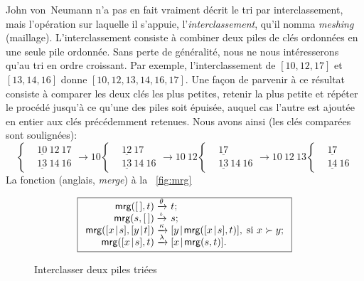 John von~Neumann n'a pas en fait vraiment décrit le tri par
interclassement, mais l'opération sur laquelle il s'appuie,
l'\emph{interclassement}, qu'il nomma \emph{meshing}
(maillage). L'interclassement consiste à combiner deux piles de clés
ordonnées en une seule pile ordonnée. Sans perte de généralité, nous
ne nous intéresserons qu'au tri en ordre croissant. Par exemple,
l'interclassement de \([10,12,17]\) et \([13,14,16]\) donne
\([10,12,13,14,16,17]\). Une façon de parvenir à ce résultat consiste
à comparer les deux clés les plus petites, retenir la plus petite et
répéter le procédé jusqu'à ce qu'une des piles soit épuisée, auquel
cas l'autre est ajoutée en entier aux clés précédemment retenues. Nous
avons ainsi (les clés comparées sont soulignées):
\begin{equation*}
\left\{
\begin{aligned}
&\underline{10}~12~17\\
&\underline{13}~14~16
\end{aligned}
\right.
\rightarrow 10
\left\{
\begin{aligned}
&\underline{12}~17\\
&\underline{13}~14~16
\end{aligned}
\right.
\rightarrow 10~12
\left\{
\begin{aligned}
&\underline{17}\\
&\underline{13}~14~16
\end{aligned}
\right.
\rightarrow 10~12~13
\left\{
\begin{aligned}
&\underline{17}\\
&\underline{14}~16
\end{aligned}
\right.
\end{equation*}
La fonction  (anglais, \emph{merge})
à la \fig~\vref{fig:mrg}
\begin{figure}[b]
\begin{equation*}
\boxed{%
\begin{array}{r@{\;}l@{\;}l}
\fun{mrg}(\el,t)         & \xrightarrow{\smash{\theta}} & t;\\
\fun{mrg}(s,\el)         & \xrightarrow{\smash{\iota}} & s;\\
\fun{mrg}(\cons{x}{s},\cons{y}{t}) & \xrightarrow{\smash{\kappa}}
& \cons{y}{\fun{mrg}(\cons{x}{s},t)},\;\text{si \(x \succ y\)};\\
\fun{mrg}(\cons{x}{s},t) & \xrightarrow{\smash{\lambda}}
                         & \cons{x}{\fun{mrg}(s,t)}.
\end{array}}
\end{equation*}
\caption{Interclasser deux piles triées}
\label{fig:mrg}
\end{figure}
